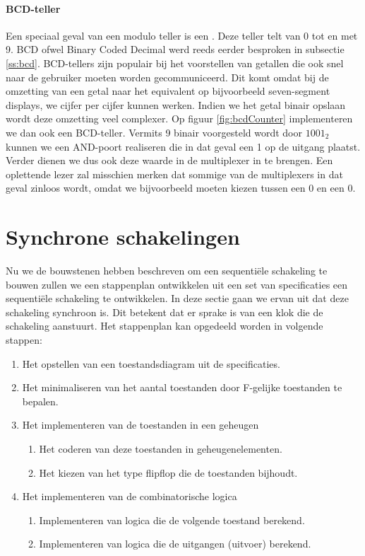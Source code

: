 \paragraph{BCD-teller}
Een speciaal geval van een modulo teller is een . Deze teller telt van 0 tot en met 9. BCD ofwel Binary Coded Decimal werd reeds eerder besproken in subsectie \ref{ss:bcd}. BCD-tellers zijn populair bij het voorstellen van getallen die ook snel naar de gebruiker moeten worden gecommuniceerd. Dit komt omdat bij de omzetting van een getal naar het equivalent op bijvoorbeeld seven-segment displays, we cijfer per cijfer kunnen werken. Indien we het getal binair opslaan wordt deze omzetting veel complexer. Op figuur \ref{fig:bcdCounter} implementeren we dan ook een BCD-teller. Vermits 9 binair voorgesteld wordt door $1001_2$ kunnen we een AND-poort realiseren die in dat geval een 1 op de uitgang plaatst. Verder dienen we dus ook deze waarde in de multiplexer in te brengen. Een oplettende lezer zal misschien merken dat sommige van de multiplexers in dat geval zinloos wordt, omdat we bijvoorbeeld moeten kiezen tussen een 0 en een 0.
\section{Synchrone schakelingen}
\label{s:synchroneSequence}
Nu we de bouwstenen hebben beschreven om een sequenti\"ele schakeling te bouwen zullen we een stappenplan ontwikkelen uit een set van specificaties een sequenti\"ele schakeling te ontwikkelen. In deze sectie gaan we ervan uit dat deze schakeling synchroon is. Dit betekent dat er sprake is van een klok die de schakeling aanstuurt. Het stappenplan kan opgedeeld worden in volgende stappen:
\begin{enumerate}
 \item Het opstellen van een toestandsdiagram uit de specificaties.
 \item Het minimaliseren van het aantal toestanden door F-gelijke toestanden te bepalen.
 \item Het implementeren van de toestanden in een geheugen
 \begin{enumerate}
  \item Het coderen van deze toestanden in geheugenelementen.
  \item Het kiezen van het type flipflop die de toestanden bijhoudt.
 \end{enumerate}
 \item Het implementeren van de combinatorische logica
 \begin{enumerate}
  \item Implementeren van logica die de volgende toestand berekend.
  \item Implementeren van logica die de uitgangen (uitvoer) berekend.
 \end{enumerate}
\end{enumerate}
